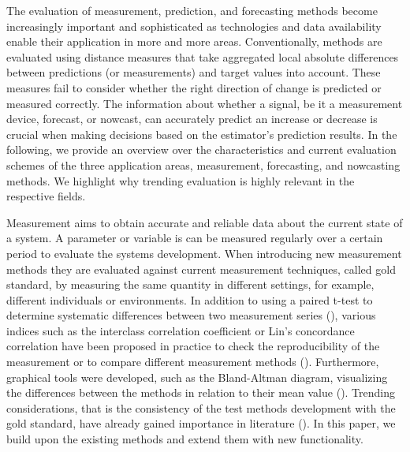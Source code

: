 The evaluation of measurement, prediction, and forecasting methods become increasingly important and sophisticated as technologies and data availability enable their application in more and more areas. 
Conventionally, methods are evaluated using distance measures that take aggregated local absolute differences between predictions (or measurements) and target values into account. 
These measures fail to consider whether the right direction of change is predicted or measured correctly.
The information about whether a signal, be it a measurement device, forecast, or nowcast, can accurately predict an increase or decrease is crucial when making decisions based on the estimator's prediction results. 
In the following, we provide an overview over the characteristics and current evaluation schemes of the three application areas, measurement, forecasting, and nowcasting methods.
We highlight why trending evaluation is highly relevant in the respective fields.

Measurement aims to obtain accurate and reliable data about the current state of a system. 
A parameter or variable is can be measured regularly over a certain period to evaluate the systems development.
When introducing new measurement methods they are evaluated against current measurement techniques, called gold standard, by measuring the same quantity in different settings, for example, different individuals or environments.
In addition to using a paired t-test to determine systematic differences between two measurement series (\cite{watson2010method}), various indices such as the interclass correlation coefficient or Lin's concordance correlation have been proposed in practice to check the reproducibility of the measurement or to compare different measurement methods (\cite{lawrence1989concordance,koo2016guideline}). 
Furthermore, graphical tools were developed, such as the Bland-Altman diagram, visualizing the differences between the methods in relation to their mean value (\cite{bland1986statistical}). 
Trending considerations, that is the consistency of the test methods development with the gold standard, have already gained importance in literature (\cite{Saugel2015,saugel2018error,hiraishi2021concordance}). 
In this paper, we build upon the existing methods and extend them with new functionality.

